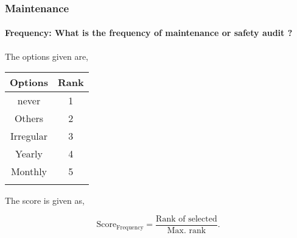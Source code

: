 \documentclass[oneside,twocolumn]{article}
\newcommand{\tsub}[2]{\text{#1}_{\text{#2}}}
\newcommand{\dsub}[2]{\dfrac{\text{#1}}{\text{#2}}}
\newcommand{\singsel}[1]
{
	\[
		\tsub{Score}{#1} = \dsub{Rank of selected}{Max. rank}.
	\]
}
\newenvironment{ttable}
{
\begin{center}
\begin{tabular}{c|c}
\hline
}
{
\\ \hline
\end{tabular}
\end{center}
}
\begin{document}
\subsubsection{Maintenance}

\paragraph{Frequency: What is the frequency of  maintenance or safety audit ?}

The options given are,
\begin{ttable}
Options & Rank \\ \hline
never & 1 \\
Others & 2 \\
Irregular & 3 \\
Yearly & 4 \\
Monthly & 5 \\
\hline
\end{ttable}
The score is given as,
\singsel{Frequency}
\end{document}
